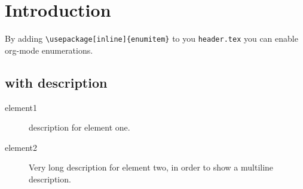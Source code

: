


\section{Introduction}
\label{sec:org76cb860}
By adding \texttt{\textbackslash{}usepackage[inline]\{enumitem\}} to you \texttt{header.tex} you can enable
org-mode enumerations.
\subsection{with description}
\label{sec:org8b839b4}
\begin{description}
\item[{element1}] description for element one.
\item[{element2}] Very long description for element two, in order to show a
multiline description.
\end{description}


